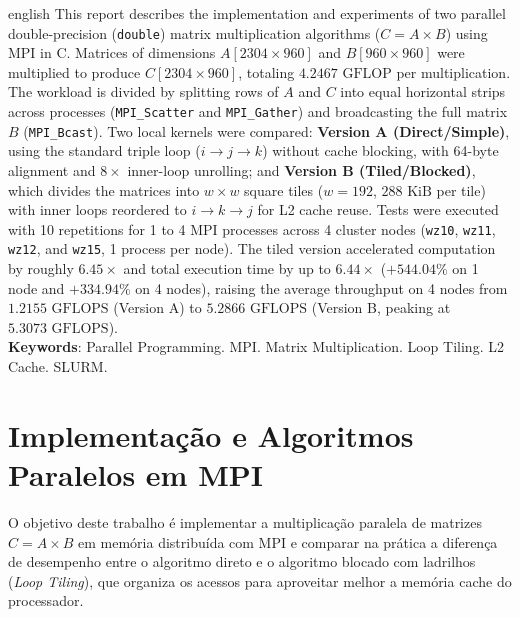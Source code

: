 \documentclass[12pt, a4paper, twoside, chapter=TITLE, subsection=TITLE, section=TITLE, subsubsection=TITLE, english, brazil]{abntex2}
\begin{document}
\begin{resumo}[Abstract]
    \begin{otherlanguage*}{english}
        This report describes the implementation and experiments of two parallel double-precision (\texttt{double}) matrix multiplication algorithms ($C = A \times B$) using MPI in C. Matrices of dimensions $A[2304 \times 960]$ and $B[960 \times 960]$ were multiplied to produce $C[2304 \times 960]$, totaling $4.2467\text{ GFLOP}$ per multiplication. The workload is divided by splitting rows of $A$ and $C$ into equal horizontal strips across processes (\nolinkurl{MPI_Scatter} and \nolinkurl{MPI_Gather}) and broadcasting the full matrix $B$ (\nolinkurl{MPI_Bcast}). Two local kernels were compared: \textbf{Version A (Direct/Simple)}, using the standard triple loop ($i \to j \to k$) without cache blocking, with 64-byte alignment and $8\times$ inner-loop unrolling; and \textbf{Version B (Tiled/Blocked)}, which divides the matrices into $w \times w$ square tiles ($w = 192$, $288\text{ KiB}$ per tile) with inner loops reordered to $i \to k \to j$ for L2 cache reuse. Tests were executed with 10 repetitions for 1 to 4 MPI processes across 4 cluster nodes (\texttt{wz10}, \texttt{wz11}, \texttt{wz12}, and \texttt{wz15}, 1 process per node). The tiled version accelerated computation by roughly $6.45\times$ and total execution time by up to $6.44\times$ ($+544.04\%$ on 1 node and $+334.94\%$ on 4 nodes), raising the average throughput on 4 nodes from $1.2155\text{ GFLOPS}$ (Version A) to $5.2866\text{ GFLOPS}$ (Version B, peaking at $5.3073\text{ GFLOPS}$). \\
        \vspace{\onelineskip}
        \noindent
        \textbf{Keywords}: Parallel Programming. MPI. Matrix Multiplication. Loop Tiling. L2 Cache. SLURM.
    \end{otherlanguage*}
\end{resumo}

\tableofcontents*
\cleardoublepage

\textual

\chapter{Implementação e Algoritmos Paralelos em MPI}

O objetivo deste trabalho é implementar a multiplicação paralela de matrizes $C = A \times B$ em memória distribuída com MPI e comparar na prática a diferença de desempenho entre o algoritmo direto e o algoritmo blocado com ladrilhos (\textit{Loop Tiling}), que organiza os acessos para aproveitar melhor a memória cache do processador.
\end{document}

